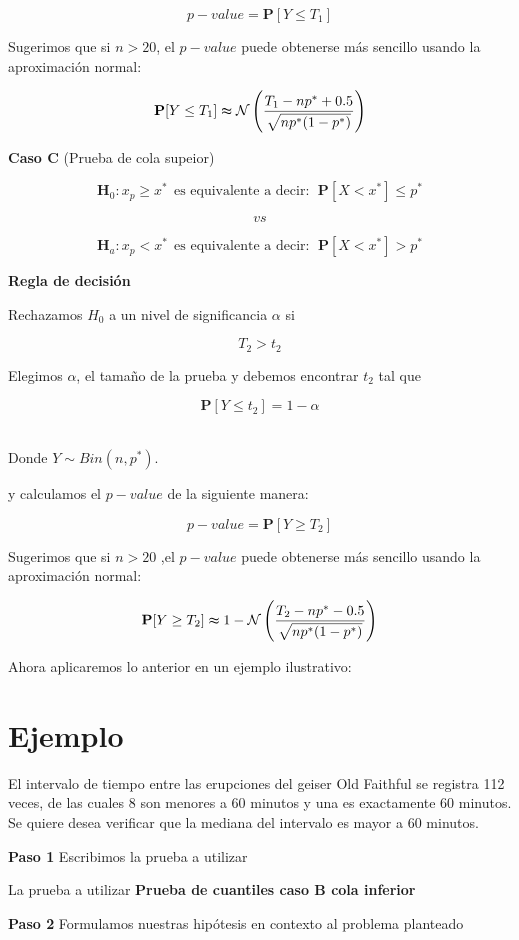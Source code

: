 \documentclass[
  a4paper,
  oneside,
  openany]{book}
\begin{document}
\[p-value= \mathbf{P}[Y\leq T_{1}]\]

Sugerimos que si \(n > 20\), el \(p-value\) puede obtenerse más sencillo usando la aproximación normal:

\[\mathbf{P}[Y\leq T_{1}] \thickapprox \mathcal{N} \left(\frac{T_{1}-np^*+0.5}{\sqrt{np^*(1-p^*)}}\right)\]

\textbf{Caso C} (Prueba de cola supeior)

\[\textbf{H}_0: x_{p} \geq x^* \ \ \mbox{es equivalente a decir}: \ \ \mathbf{P}[X < x^*]\leq p^*\]

\[vs\]

\[\textbf{H}_a: x_{p} < x^*  \ \ \mbox{es equivalente a decir}: \ \ \mathbf{P}[X < x^*]> p^*\]

\textbf{Regla de decisión}

Rechazamos \(H_0\) a un nivel de significancia \(\alpha\) si

\[T_{2} > t_{2}\]

Elegimos \(\alpha\), el tamaño de la prueba y debemos encontrar \(t_{2}\) tal que

\[\mathbf{P}[Y \leq t_{2}]=1-\alpha\]~

Donde \(Y \sim Bin (n,p^*)\).

y calculamos el \(p-value\) de la siguiente manera:

\[p-value=\mathbf{P}[Y\geq T_{2}]\]

Sugerimos que si \(n > 20\) ,el \(p-value\) puede obtenerse más sencillo usando la aproximación normal:

\[\mathbf{P}[Y\geq T_{2}] \thickapprox 1- \mathcal{N} \left(\frac{T_{2}-np^*-0.5}{\sqrt{np^*(1-p^*)}}\right)\]

Ahora aplicaremos lo anterior en un ejemplo ilustrativo:

\hypertarget{ejemplo-1}{%
\section{Ejemplo}\label{ejemplo-1}}

El intervalo de tiempo entre las erupciones del geiser Old Faithful se registra 112 veces, de las cuales 8 son menores a 60 minutos y una es exactamente 60 minutos. Se quiere desea verificar que la mediana del intervalo es mayor a 60 minutos.

\textbf{Paso 1} Escribimos la prueba a utilizar

La prueba a utilizar \textbf{Prueba de cuantiles caso B cola inferior}

\textbf{Paso 2} Formulamos nuestras hipótesis en contexto al problema planteado
\end{document}
